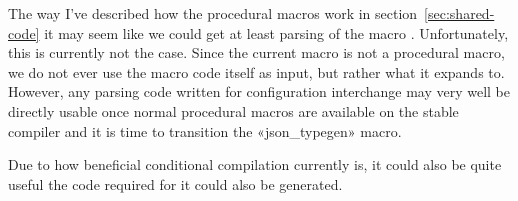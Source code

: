The way I've described how the procedural macros work in section~\ref{sec:shared-code} it may seem like we could get at least parsing of the macro . Unfortunately, this is currently not the case. Since the current macro is not a procedural macro, we do not ever use the macro code itself as input, but rather what it expands to. However, any parsing code written for configuration interchange may very well be directly usable once normal procedural macros are available on the stable compiler and it is time to transition the «json_typegen» macro.



Due to how beneficial conditional compilation currently is, it could also be quite useful the code required for it could also be generated.

